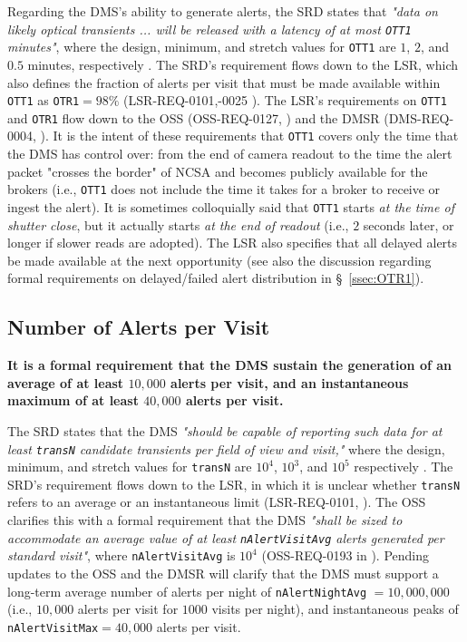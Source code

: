 \documentclass[DM,authoryear,toc]{lsstdoc}
\begin{document}
Regarding the DMS's ability to generate alerts, the SRD states that {\it "data on likely optical transients ... will be released with a latency of at most {\tt OTT1} minutes"}, where the design, minimum, and stretch values for {\tt OTT1} are $1$, $2$, and $0.5$ minutes, respectively . The SRD's requirement flows down to the LSR, which also defines the fraction of alerts per visit that must be made available within {\tt OTT1} as {\tt OTR1}$=98\%$ (LSR-REQ-0101,-0025 ). The LSR's requirements on {\tt OTT1} and {\tt OTR1} flow down to the OSS (OSS-REQ-0127, ) and the DMSR (DMS-REQ-0004, ). It is the intent of these requirements that {\tt OTT1} covers only the time that the DMS has control over: from the end of camera readout to the time the alert packet "crosses the border" of NCSA and becomes publicly available for the brokers (i.e., {\tt OTT1} does not include the time it takes for a broker to receive or ingest the alert). It is sometimes colloquially said that {\tt OTT1} starts {\it at the time of shutter close}, but it actually starts {\it at the end of readout} (i.e., $2$ seconds later, or longer if slower reads are adopted). The LSR also specifies that all delayed alerts be made available at the next opportunity (see also the discussion regarding formal requirements on delayed/failed alert distribution in \S~\ref{ssec:OTR1}).

\subsection{Number of Alerts per Visit}\label{ssec:transN}

{\bf It is a formal requirement that the DMS sustain the generation of an average of at least $10,000$ alerts per visit, and an instantaneous maximum of at least $40,000$ alerts per visit.}

The SRD states that the DMS {\it "should be capable of reporting such data for at least {\tt transN} candidate transients per field of view and visit,"} where the design, minimum, and stretch values for {\tt transN} are $10^4$, $10^3$, and $10^5$ respectively . The SRD's requirement flows down to the LSR, in which it is unclear whether {\tt transN} refers to an average or an instantaneous limit (LSR-REQ-0101, ). The OSS clarifies this with a formal requirement that the DMS {\it "shall be sized to accommodate an average value of at least {\tt nAlertVisitAvg} alerts generated per standard visit"}, where {\tt nAlertVisitAvg} is $10^4$ (OSS-REQ-0193 in ). Pending updates to the OSS and the DMSR will clarify that the DMS must support a long-term average number of alerts per night of {\tt nAlertNightAvg} $=10,000,000$ (i.e., $10,000$ alerts per visit for $1000$ visits per night), and instantaneous peaks of {\tt nAlertVisitMax}$=40,000$ alerts per visit.
\end{document}

